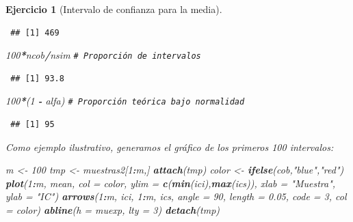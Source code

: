 \documentclass[
  spanish,
  10pt,
]{book}
\newenvironment{Shaded}{\begin{snugshade}}{\end{snugshade}}
\newcommand{\AttributeTok}[1]{\textcolor[rgb]{0.13,0.29,0.53}{#1}}
\newcommand{\CommentTok}[1]{\textcolor[rgb]{0.56,0.35,0.01}{\textit{#1}}}
\newcommand{\DecValTok}[1]{\textcolor[rgb]{0.00,0.00,0.81}{#1}}
\newcommand{\FloatTok}[1]{\textcolor[rgb]{0.00,0.00,0.81}{#1}}
\newcommand{\FunctionTok}[1]{\textcolor[rgb]{0.13,0.29,0.53}{\textbf{#1}}}
\newcommand{\NormalTok}[1]{#1}
\newcommand{\OtherTok}[1]{\textcolor[rgb]{0.56,0.35,0.01}{#1}}
\newcommand{\SpecialCharTok}[1]{\textcolor[rgb]{0.81,0.36,0.00}{\textbf{#1}}}
\newcommand{\StringTok}[1]{\textcolor[rgb]{0.31,0.60,0.02}{#1}}
\theoremstyle{break}
\newtheorem{exercise}{Ejercicio}[chapter]
\theoremstyle{nonumberplain}
\renewcommand{\CommentTok}[1]{\textcolor[rgb]{0.41,0.41,0.41}{\texttt{#1}}}
\begin{document}
\begin{exercise}[Intervalo de confianza para la media]
\begin{enumerate}
\begin{verbatim}
 ## [1] 469
\end{verbatim}

\begin{Shaded}
\begin{Highlighting}[]
\DecValTok{100}\SpecialCharTok{*}\NormalTok{ncob}\SpecialCharTok{/}\NormalTok{nsim     }\CommentTok{\# Proporción de intervalos}
\end{Highlighting}
\end{Shaded}

\begin{verbatim}
 ## [1] 93.8
\end{verbatim}

\begin{Shaded}
\begin{Highlighting}[]
\DecValTok{100}\SpecialCharTok{*}\NormalTok{(}\DecValTok{1} \SpecialCharTok{{-}}\NormalTok{ alfa)    }\CommentTok{\# Proporción teórica bajo normalidad}
\end{Highlighting}
\end{Shaded}

\begin{verbatim}
 ## [1] 95
\end{verbatim}

  Como ejemplo ilustrativo, generamos el gráfico de los primeros 100 intervalos:

\begin{Shaded}
\begin{Highlighting}[]
\NormalTok{m }\OtherTok{\textless{}{-}} \DecValTok{100}
\NormalTok{tmp }\OtherTok{\textless{}{-}}\NormalTok{ muestras2[}\DecValTok{1}\SpecialCharTok{:}\NormalTok{m,]}
\FunctionTok{attach}\NormalTok{(tmp)}
\NormalTok{color }\OtherTok{\textless{}{-}} \FunctionTok{ifelse}\NormalTok{(cob,}\StringTok{"blue"}\NormalTok{,}\StringTok{"red"}\NormalTok{)}
\FunctionTok{plot}\NormalTok{(}\DecValTok{1}\SpecialCharTok{:}\NormalTok{m, mean, }\AttributeTok{col =}\NormalTok{ color, }\AttributeTok{ylim =} \FunctionTok{c}\NormalTok{(}\FunctionTok{min}\NormalTok{(ici),}\FunctionTok{max}\NormalTok{(ics)), }
     \AttributeTok{xlab =} \StringTok{"Muestra"}\NormalTok{, }\AttributeTok{ylab =} \StringTok{"IC"}\NormalTok{)}
\FunctionTok{arrows}\NormalTok{(}\DecValTok{1}\SpecialCharTok{:}\NormalTok{m, ici, }\DecValTok{1}\SpecialCharTok{:}\NormalTok{m, ics, }\AttributeTok{angle =} \DecValTok{90}\NormalTok{, }\AttributeTok{length =} \FloatTok{0.05}\NormalTok{, }\AttributeTok{code =} \DecValTok{3}\NormalTok{, }\AttributeTok{col =}\NormalTok{ color)}
\FunctionTok{abline}\NormalTok{(}\AttributeTok{h =}\NormalTok{ muexp, }\AttributeTok{lty =} \DecValTok{3}\NormalTok{)}
\FunctionTok{detach}\NormalTok{(tmp)}
\end{Highlighting}
\end{Shaded}


\end{enumerate}
\end{exercise}
\end{document}
